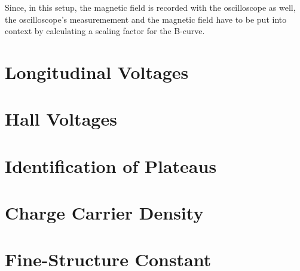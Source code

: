 Since, in this setup, the magnetic field is recorded with the oscilloscope as well, the oscilloscope's measuremement and the magnetic field have to be put into context by calculating a scaling factor for the B-curve.

\section{Longitudinal Voltages} %

\section{Hall Voltages} %

\section{Identification of Plateaus} %

\section{Charge Carrier Density} %

\section{Fine-Structure Constant} %
